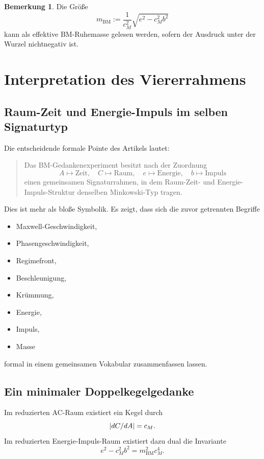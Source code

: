 \documentclass[11pt,a4paper]{article}
\theoremstyle{definition}
\newtheorem{bemerkung}[definition]{Bemerkung}
\theoremstyle{plain}
\begin{document}
	\begin{bemerkung}
		Die Größe
		\[
		m_{\mathrm{BM}} := \frac{1}{c_M^2}\sqrt{e^2 - c_M^2 b^2}
		\]
		kann als effektive BM-Ruhemasse gelesen werden, sofern der Ausdruck unter der Wurzel nichtnegativ ist.
	\end{bemerkung}
	
	\section{Interpretation des Viererrahmens}
	
	\subsection{Raum-Zeit und Energie-Impuls im selben Signaturtyp}
	
	Die entscheidende formale Pointe des Artikels lautet:
	\begin{quote}
		Das BM-Gedankenexperiment besitzt nach der Zuordnung
		\[
		A\mapsto \text{Zeit},\quad C\mapsto \text{Raum},\quad e\mapsto \text{Energie},\quad b\mapsto \text{Impuls}
		\]
		einen gemeinsamen Signaturrahmen, in dem Raum-Zeit- und Energie-Impuls-Struktur denselben Minkowski-Typ tragen.
	\end{quote}
	
	Dies ist mehr als bloße Symbolik. Es zeigt, dass sich die zuvor getrennten Begriffe
	\begin{itemize}[leftmargin=2em]
		\item Maxwell-Geschwindigkeit,
		\item Phasengeschwindigkeit,
		\item Regimefront,
		\item Beschleunigung,
		\item Krümmung,
		\item Energie,
		\item Impuls,
		\item Masse
	\end{itemize}
	formal in einem gemeinsamen Vokabular zusammenfassen lassen.
	
	\subsection{Ein minimaler Doppelkegelgedanke}
	
	Im reduzierten AC-Raum existiert ein Kegel durch
	\[
	\abs{dC/dA} = c_M.
	\]
	Im reduzierten Energie-Impuls-Raum existiert dazu dual die Invariante
	\[
	e^2 - c_M^2 b^2 = m_{\mathrm{BM}}^2 c_M^4.
	\]
	
\end{document}
